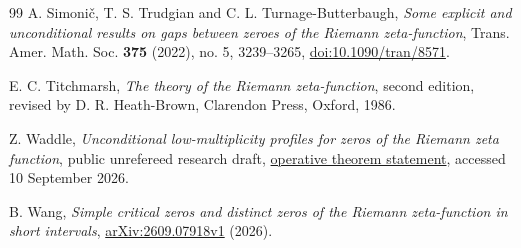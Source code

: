 \begin{thebibliography}{99}
 A. Simoni\v{c}, T. S. Trudgian and
C. L. Turnage-Butterbaugh,
\emph{Some explicit and unconditional results on gaps between
zeroes of the Riemann zeta-function}, Trans. Amer. Math. Soc.
\textbf{375} (2022), no. 5, 3239--3265,
\href{https://doi.org/10.1090/tran/8571}{doi:10.1090/tran/8571}.

 E. C. Titchmarsh,
\emph{The theory of the Riemann zeta-function}, second edition,
revised by D. R. Heath-Brown, Clarendon Press, Oxford, 1986.

 Z. Waddle,
\emph{Unconditional low-multiplicity profiles for zeros of the
Riemann zeta function}, public unrefereed research draft,
\href{https://github.com/zach7036/riemann-hypothesis-research/blob/main/publication/low-multiplicity-zeta/THEOREM.md}{operative theorem statement},
accessed 10 September 2026.

 B. Wang,
\emph{Simple critical zeros and distinct zeros of the Riemann zeta-function
in short intervals},
\href{https://arxiv.org/abs/2609.07918v1}{arXiv:2609.07918v1} (2026).

\end{thebibliography}
